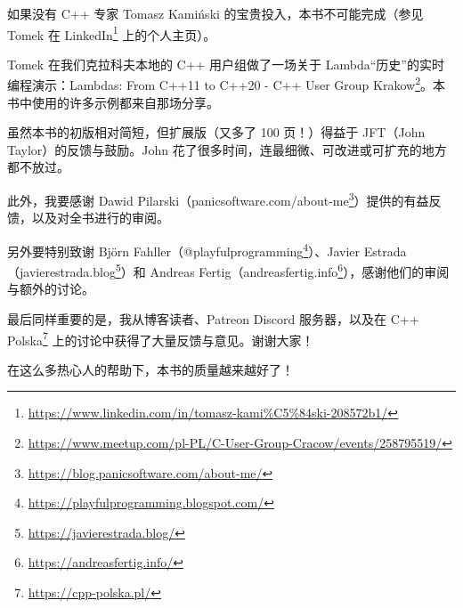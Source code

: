 如果没有 C++ 专家 Tomasz Kamiński 的宝贵投入，本书不可能完成（参见 Tomek 在 LinkedIn\footnote{\url{https://www.linkedin.com/in/tomasz-kami\%C5\%84ski-208572b1/}} 上的个人主页）。

Tomek 在我们克拉科夫本地的 C++ 用户组做了一场关于 Lambda“历史”的实时编程演示：Lambdas: From C++11 to C++20 - C++ User Group Krakow\footnote{\url{https://www.meetup.com/pl-PL/C-User-Group-Cracow/events/258795519/}}。本书中使用的许多示例都来自那场分享。

虽然本书的初版相对简短，但扩展版（又多了 100 页！）得益于 JFT（John Taylor）的反馈与鼓励。John 花了很多时间，连最细微、可改进或可扩充的地方都不放过。

此外，我要感谢 Dawid Pilarski（panicsoftware.com/about-me\footnote{\url{https://blog.panicsoftware.com/about-me/}}）提供的有益反馈，以及对全书进行的审阅。

另外要特别致谢 Björn Fahller（@playfulprogramming\footnote{\url{https://playfulprogramming.blogspot.com/}}）、Javier Estrada（javierestrada.blog\footnote{\url{https://javierestrada.blog/}}）和 Andreas Fertig（andreasfertig.info\footnote{\url{https://andreasfertig.info/}}），感谢他们的审阅与额外的讨论。

最后同样重要的是，我从博客读者、Patreon Discord 服务器，以及在 C++ Polska\footnote{\url{https://cpp-polska.pl/}} 上的讨论中获得了大量反馈与意见。谢谢大家！

在这么多热心人的帮助下，本书的质量越来越好了！
